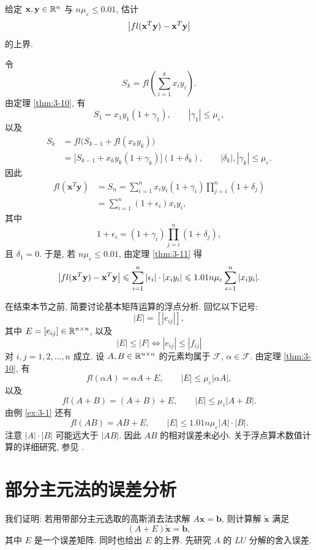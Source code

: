 \begin{example}
\label{ex:3-1}
给定 $\mathbf{x},\mathbf{y}\in\mathbb{R}^n$ 与 $n\mu_\varepsilon\leqslant0.01$, 估计
\[
  \left|fl(\mathbf{x}^T\mathbf{y})-\mathbf{x}^T\mathbf{y}\right|
\]
的上界.

令
\[
  S_k=fl\left(\sum_{i=1}^{k}x_iy_i\right).
\]
由定理 \ref{thm:3-10}, 有
\[
  S_1=x_1y_1(1+\gamma_1),\qquad|\gamma_1|\leqslant\mu_\varepsilon,
\]
以及
\[
  \begin{aligned}
    S_k&=fl\bigl(S_{k-1}+fl(x_ky_k)\bigr)\\
       &=\bigl[S_{k-1}+x_ky_k(1+\gamma_k)\bigr](1+\delta_k),
       \qquad|\delta_k|,|\gamma_k|\leqslant\mu_\varepsilon.
  \end{aligned}
\]
因此
\[
  \begin{aligned}
    fl(\mathbf{x}^T\mathbf{y})
    &=S_n=\sum_{i=1}^{n}x_iy_i(1+\gamma_i)\prod_{j=i}^{n}(1+\delta_j)\\
    &=\sum_{i=1}^{n}(1+\epsilon_i)x_iy_i,
  \end{aligned}
\]
其中
\[
  1+\epsilon_i=(1+\gamma_i)\prod_{j=i}^{n}(1+\delta_j),
\]
且 $\delta_1=0$. 于是, 若 $n\mu_\varepsilon\leqslant0.01$, 由定理 \ref{thm:3-11} 得
\[
  \left|fl(\mathbf{x}^T\mathbf{y})-\mathbf{x}^T\mathbf{y}\right|
  \leqslant\sum_{i=1}^{n}|\epsilon_i|\cdot|x_iy_i|
  \leqslant1.01n\mu_\varepsilon\sum_{i=1}^{n}|x_iy_i|.
\]
\end{example}

在结束本节之前, 简要讨论基本矩阵运算的浮点分析. 回忆以下记号:
\[
  |E|=[|e_{ij}|],
\]
其中 $E=[e_{ij}]\in\mathbb{R}^{n\times n}$, 以及
\[
  |E|\leqslant|F|\iff|e_{ij}|\leqslant|f_{ij}|
\]
对 $i,j=1,2,\ldots,n$ 成立. 设 $A,B\in\mathbb{R}^{n\times n}$ 的元素均属于 $\mathcal{F}$, $\alpha\in\mathcal{F}$. 由定理 \ref{thm:3-10}, 有
\[
  fl(\alpha A)=\alpha A+E,\qquad|E|\leqslant\mu_\varepsilon|\alpha A|,
\]
以及
\[
  fl(A+B)=(A+B)+E,\qquad|E|\leqslant\mu_\varepsilon|A+B|.
\]
由例 \ref{ex:3-1} 还有
\[
  fl(AB)=AB+E,\qquad|E|\leqslant1.01n\mu_\varepsilon|A|\cdot|B|.
\]
注意 $|A|\cdot|B|$ 可能远大于 $|AB|$. 因此 $AB$ 的相对误差未必小. 关于浮点算术数值计算的详细研究, 参见 \cite{src:65}.

\section{部分主元法的误差分析}

我们证明: 若用带部分主元选取的高斯消去法求解 $A\mathbf{x}=\mathbf{b}$, 则计算解 $\tilde{\mathbf{x}}$ 满足
\[
  (A+E)\tilde{\mathbf{x}}=\mathbf{b},
\]
其中 $E$ 是一个误差矩阵. 同时也给出 $E$ 的上界. 先研究 $A$ 的 $LU$ 分解的舍入误差.

